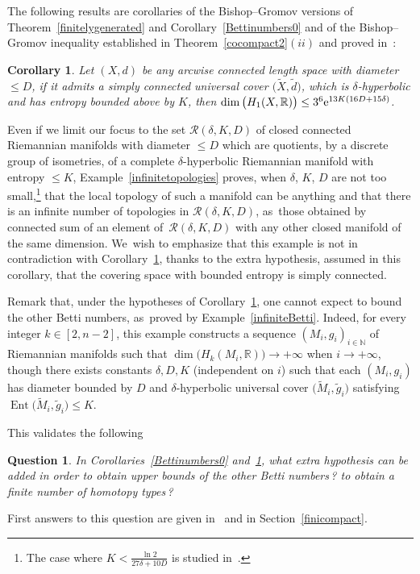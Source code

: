 \documentclass[10pt,a4paper]{amsart}
\providecommand{\cal}{\mathcal}
\numberwithin{equation}{section}
\newtheorem{Corollary}[theor]{Corollary}
\newtheorem{question}[theor]{Question}
\newcommand{\N}{\mathbb{N}}
\newcommand{\R}{\mathbb{R}}
\newcommand{\f}{\rightarrow}
\newcommand{\Ent}{\operatorname{Ent}}
\begin{document}
The following results are corollaries of the Bishop--Gromov versions of Theorem~\ref{finitelygenerated} and Corollary~\ref{Bettinumbers0} and of the
 Bishop--Gromov inequality established in Theorem~\ref{cocompact2}$(ii)$ and proved in~\cite[Theorem~5.1]{BCGS}:

\begin{Corollary}\label{Bettinumbers}
Let $(X,d)$ be any arcwise connected length space with diameter $\le D$, if it admits a simply connected universal cover $ \big(\widetilde X, \tilde d\big)$, which is $\delta$-hyperbolic
and has entropy bounded above by $K$, then $\dim \big( H_1 (X, \R) \big) \le 3^6 {\rm e}^{13 K (16 D + 15 \delta)}$.
\end{Corollary}
Even if we limit our focus to the set ${\cal R} (\delta, K, D)$ of closed connected Riemannian manifolds with diameter $\le D$ which are quotients, by a discrete
group of isometries, of a complete $\delta$-hyperbolic Riemannian manifold with entropy $\le K$, Example~\ref{infinitetopologies} proves, when $\delta$, $K$, $D$
are not too small,\footnote{The case where $K < \frac{\ln 2}{27 \delta + 10 D}$ is studied in~\cite[Section~5.2.2]{BCGS}.} that the local topology of such a
manifold can be anything and that there is an infinite number of topologies in ${\cal R} (\delta, K, D)$, as~those obtained by connected sum of an element of~${\cal R} (\delta, K, D)$ with any other closed manifold of
the same dimension. We~wish to emphasize that this example is not in contradiction with Corollary~\ref{Bettinumbers}, thanks to the extra hypothesis, assumed in this
corollary, that the covering space with bounded entropy is simply connected.

{\sloppy
Remark that, under the hypotheses of Corollary~\ref{Bettinumbers}, one cannot expect to bound the other Betti numbers, as~proved by Example~\ref{infiniteBetti}. Indeed, for every integer $k \in [2, n-2]$, this example constructs a sequence $(M_i, g_i)_{i \in \N} $ of Riemannian
manifolds such that $\dim \big( H_k (M_i, \R) \big) \f + \infty$ when $i \f +\infty$, though there exists constants $\delta, D, K$ (independent on $i$) such that each $(M_i, g_i)$ has diameter bounded by $ D$ and $\delta$-hyperbolic universal cover $\big(\widetilde M_i, \tilde g_i\big) $ satisfying
\mbox{$ \Ent \big(\widetilde M_i, \tilde g_i\big) \le K$}.

}

This validates the following
\begin{question}
In Corollaries~\ref{Bettinumbers0} and~\ref{Bettinumbers}, what extra hypothesis can be added in order to obtain upper bounds of
the other Betti numbers\,? to obtain a finite number of homotopy types\,?
\end{question}
First answers to this question are given in~\cite{BCGS2} and in Section~\ref{finicompact}.
\end{document}
